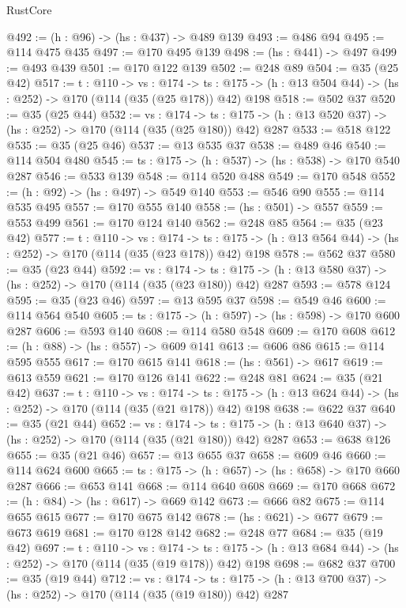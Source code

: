 \begin{lexlean}{RustCore}
\begin{coremodule}
@492 := (h : @96) -> (hs : @437) -> @489 @139
@493 := @486 @94
@495 := @114 @475 @435
@497 := @170 @495 @139
@498 := (hs : @441) -> @497
@499 := @493 @439
@501 := @170 @122 @139
@502 := @248 @89
@504 := @35 (@25 @42)
@517 := {t : @110} ->
  {vs : @174} ->
  {ts : @175} -> (h : @13 @504 @44) -> (hs : @252) -> @170 (@114 (@35 (@25 @178)) @42) @198
@518 := @502 @37
@520 := @35 (@25 @44)
@532 := {vs : @174} ->
  {ts : @175} -> (h : @13 @520 @37) -> (hs : @252) -> @170 (@114 (@35 (@25 @180)) @42) @287
@533 := @518 @122
@535 := @35 (@25 @46)
@537 := @13 @535 @37
@538 := @489 @46
@540 := @114 @504 @480
@545 := {ts : @175} -> (h : @537) -> (hs : @538) -> @170 @540 @287
@546 := @533 @139
@548 := @114 @520 @488
@549 := @170 @548
@552 := (h : @92) -> (hs : @497) -> @549 @140
@553 := @546 @90
@555 := @114 @535 @495
@557 := @170 @555 @140
@558 := (hs : @501) -> @557
@559 := @553 @499
@561 := @170 @124 @140
@562 := @248 @85
@564 := @35 (@23 @42)
@577 := {t : @110} ->
  {vs : @174} ->
  {ts : @175} -> (h : @13 @564 @44) -> (hs : @252) -> @170 (@114 (@35 (@23 @178)) @42) @198
@578 := @562 @37
@580 := @35 (@23 @44)
@592 := {vs : @174} ->
  {ts : @175} -> (h : @13 @580 @37) -> (hs : @252) -> @170 (@114 (@35 (@23 @180)) @42) @287
@593 := @578 @124
@595 := @35 (@23 @46)
@597 := @13 @595 @37
@598 := @549 @46
@600 := @114 @564 @540
@605 := {ts : @175} -> (h : @597) -> (hs : @598) -> @170 @600 @287
@606 := @593 @140
@608 := @114 @580 @548
@609 := @170 @608
@612 := (h : @88) -> (hs : @557) -> @609 @141
@613 := @606 @86
@615 := @114 @595 @555
@617 := @170 @615 @141
@618 := (hs : @561) -> @617
@619 := @613 @559
@621 := @170 @126 @141
@622 := @248 @81
@624 := @35 (@21 @42)
@637 := {t : @110} ->
  {vs : @174} ->
  {ts : @175} -> (h : @13 @624 @44) -> (hs : @252) -> @170 (@114 (@35 (@21 @178)) @42) @198
@638 := @622 @37
@640 := @35 (@21 @44)
@652 := {vs : @174} ->
  {ts : @175} -> (h : @13 @640 @37) -> (hs : @252) -> @170 (@114 (@35 (@21 @180)) @42) @287
@653 := @638 @126
@655 := @35 (@21 @46)
@657 := @13 @655 @37
@658 := @609 @46
@660 := @114 @624 @600
@665 := {ts : @175} -> (h : @657) -> (hs : @658) -> @170 @660 @287
@666 := @653 @141
@668 := @114 @640 @608
@669 := @170 @668
@672 := (h : @84) -> (hs : @617) -> @669 @142
@673 := @666 @82
@675 := @114 @655 @615
@677 := @170 @675 @142
@678 := (hs : @621) -> @677
@679 := @673 @619
@681 := @170 @128 @142
@682 := @248 @77
@684 := @35 (@19 @42)
@697 := {t : @110} ->
  {vs : @174} ->
  {ts : @175} -> (h : @13 @684 @44) -> (hs : @252) -> @170 (@114 (@35 (@19 @178)) @42) @198
@698 := @682 @37
@700 := @35 (@19 @44)
@712 := {vs : @174} ->
  {ts : @175} -> (h : @13 @700 @37) -> (hs : @252) -> @170 (@114 (@35 (@19 @180)) @42) @287

\end{coremodule}
\end{lexlean}
